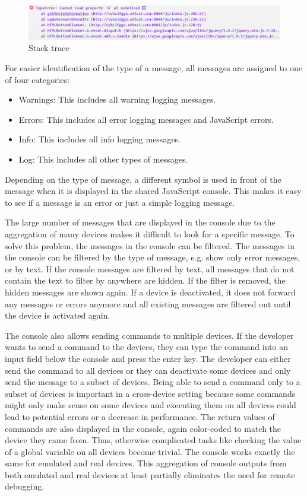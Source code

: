 \begin{figure}[H]
  \centering
    \includegraphics[width=1.0\textwidth]{images/screenshots/stack_trace_4.png}
	\caption[Screenshot: Stack trace]{Stack trace}
	\label{fig:stack_trace}
\end{figure}

For easier identification of the type of a message, all messages are assigned to one of four categories:
\begin{itemize}
	\item Warnings: This includes all warning logging messages.
	\item Errors: This includes all error logging messages and JavaScript errors.
	\item Info: This includes all info logging messages.
	\item Log: This includes all other types of messages.
\end{itemize}
Depending on the type of message, a different symbol is used in front of the message when it is displayed in the shared JavaScript console. This makes it easy to see if a message is an error or just a simple logging message.

The large number of messages that are displayed in the console due to the aggregation of many devices makes it difficult to look for a specific message. To solve this problem, the messages in the console can be filtered. The messages in the console can be filtered by the type of message, e.g. show only error messages, or by text. If the console messages are filtered by text, all messages that do not contain the text to filter by anywhere are hidden. If the filter is removed, the hidden messages are shown again. If a device is deactivated, it does not forward any messages or errors anymore and all existing messages are filtered out until the device is activated again. 

The console also allows sending commands to multiple devices. If the developer wants to send a command to the devices, they can type the command into an input field below the console and press the enter key. The developer can either send the command to all devices or they can deactivate some devices and only send the message to a subset of devices. Being able to send a command only to a subset of devices is important in a cross-device setting because some commands might only make sense on some devices and executing them on all devices could lead to potential errors or a decrease in performance. The return values of commands are also displayed in the console, again color-coded to match the device they came from. Thus, otherwise complicated tasks like checking the value of a global variable on all devices become trivial. The console works exactly the same for emulated and real devices. This aggregation of console outputs from both emulated and real devices at least partially eliminates the need for remote debugging.

